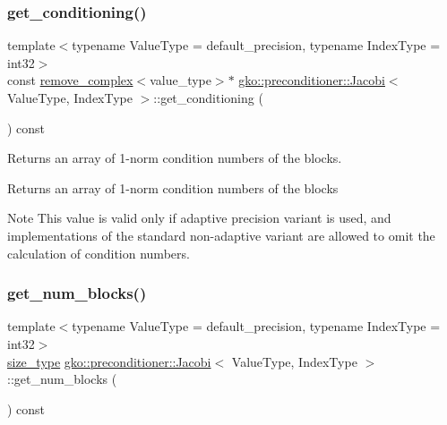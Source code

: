 \subsubsection{\texorpdfstring{get\+\_\+conditioning()}{get\_conditioning()}}
{\footnotesize\ttfamily template$<$typename Value\+Type  = default\+\_\+precision, typename Index\+Type  = int32$>$ \\
const \hyperlink{namespacegko_adfcb75c44f6b6c701989419c166f6e7e}{remove\+\_\+complex}$<$value\+\_\+type$>$$\ast$ \hyperlink{classgko_1_1preconditioner_1_1Jacobi}{gko\+::preconditioner\+::\+Jacobi}$<$ Value\+Type, Index\+Type $>$\+::get\+\_\+conditioning (\begin{DoxyParamCaption}{ }\end{DoxyParamCaption}) const\hspace{0.3cm}{\ttfamily [noexcept]}}



Returns an array of 1-\/norm condition numbers of the blocks. 

\begin{DoxyReturn}{Returns}
an array of 1-\/norm condition numbers of the blocks
\end{DoxyReturn}
\begin{DoxyNote}{Note}
This value is valid only if adaptive precision variant is used, and implementations of the standard non-\/adaptive variant are allowed to omit the calculation of condition numbers. 
\end{DoxyNote}
\mbox{\label{classgko_1_1preconditioner_1_1Jacobi_afb44d8e560f00f65c46c6813638ce24c}} 
\subsubsection{\texorpdfstring{get\+\_\+num\+\_\+blocks()}{get\_num\_blocks()}}
{\footnotesize\ttfamily template$<$typename Value\+Type  = default\+\_\+precision, typename Index\+Type  = int32$>$ \\
\hyperlink{namespacegko_a6e5c95df0ae4e47aab2f604a22d98ee7}{size\+\_\+type} \hyperlink{classgko_1_1preconditioner_1_1Jacobi}{gko\+::preconditioner\+::\+Jacobi}$<$ Value\+Type, Index\+Type $>$\+::get\+\_\+num\+\_\+blocks (\begin{DoxyParamCaption}{ }\end{DoxyParamCaption}) const\hspace{0.3cm}{\ttfamily [noexcept]}}



